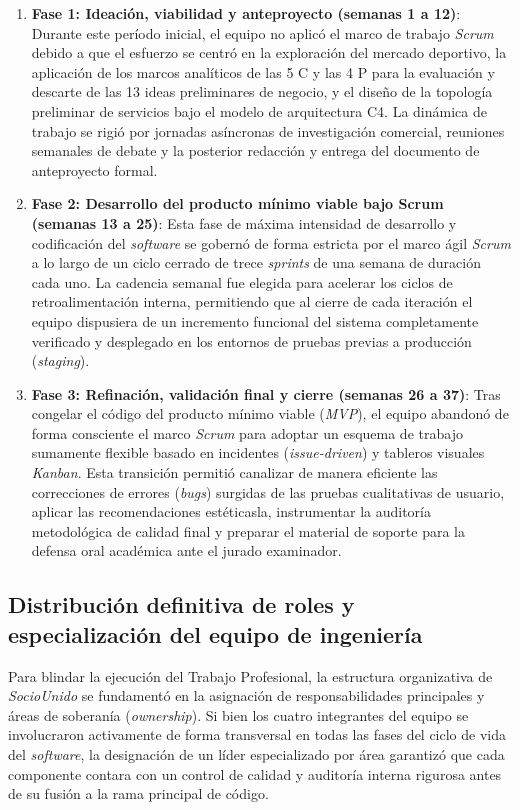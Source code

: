 \begin{enumerate}
    \item \textbf{Fase 1: Ideación, viabilidad y anteproyecto (semanas 1 a 12)}: Durante este período inicial, el equipo no aplicó el marco de trabajo \textit{Scrum} debido a que el esfuerzo se centró en la exploración del mercado deportivo, la aplicación de los marcos analíticos de las 5 C y las 4 P para la evaluación y descarte de las 13 ideas preliminares de negocio, y el diseño de la topología preliminar de servicios bajo el modelo de arquitectura C4. La dinámica de trabajo se rigió por jornadas asíncronas de investigación comercial, reuniones semanales de debate y la posterior redacción y entrega del documento de anteproyecto formal.
    \item \textbf{Fase 2: Desarrollo del producto mínimo viable bajo Scrum (semanas 13 a 25)}: Esta fase de máxima intensidad de desarrollo y codificación del \textit{software} se gobernó de forma estricta por el marco ágil \textit{Scrum} a lo largo de un ciclo cerrado de trece \textit{sprints} de una semana de duración cada uno. La cadencia semanal fue elegida para acelerar los ciclos de retroalimentación interna, permitiendo que al cierre de cada iteración el equipo dispusiera de un incremento funcional del sistema completamente verificado y desplegado en los entornos de pruebas previas a producción (\textit{staging}).
    \item \textbf{Fase 3: Refinación, validación final y cierre (semanas 26 a 37)}: Tras congelar el código del producto mínimo viable (\textit{MVP}), el equipo abandonó de forma consciente el marco \textit{Scrum} para adoptar un esquema de trabajo sumamente flexible basado en incidentes (\textit{issue-driven}) y tableros visuales \textit{Kanban}. Esta transición permitió canalizar de manera eficiente las correcciones de errores (\textit{bugs}) surgidas de las pruebas cualitativas de usuario, aplicar las recomendaciones estéticasla, instrumentar la auditoría metodológica de calidad final y preparar el material de soporte para la defensa oral académica ante el jurado examinador.
\end{enumerate}

\subsection{Distribución definitiva de roles y especialización del equipo de ingeniería}

Para blindar la ejecución del Trabajo Profesional, la estructura organizativa de \textit{SocioUnido} se fundamentó en la asignación de responsabilidades principales y áreas de soberanía (\textit{ownership}). Si bien los cuatro integrantes del equipo se involucraron activamente de forma transversal en todas las fases del ciclo de vida del \textit{software}, la designación de un líder especializado por área garantizó que cada componente contara con un control de calidad y auditoría interna rigurosa antes de su fusión a la rama principal de código.

